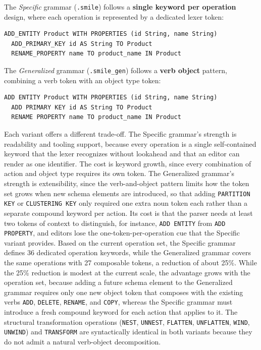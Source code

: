   The \emph{Specific} grammar (\texttt{.smile}) follows a \textbf{single keyword per operation}
  design, where each operation is represented by a dedicated lexer token:

  \begin{lstlisting}[basicstyle=\small\ttfamily, language={}, columns=fullflexible]
  ADD_ENTITY Product WITH PROPERTIES (id String, name String)
  ADD_PRIMARY_KEY id AS String TO Product
  RENAME_PROPERTY name TO product_name IN Product
  \end{lstlisting}

  The \emph{Generalized} grammar (\texttt{.smile\_gen}) follows a \textbf{verb object} pattern,
  combining a verb token with an object type token:

  \begin{lstlisting}[basicstyle=\small\ttfamily]
  ADD ENTITY Product WITH PROPERTIES (id String, name String)
  ADD PRIMARY KEY id AS String TO Product
  RENAME PROPERTY name TO product_name IN Product
  \end{lstlisting}

  Each variant offers a different trade-off. The Specific grammar's strength is readability and
  tooling support, because every operation is a single self-contained keyword that the lexer
  recognizes without lookahead and that an editor can render as one identifier. The cost is keyword
  growth, since every combination of action and object type requires its own token. The Generalized
  grammar's strength is extensibility, since the verb-and-object pattern limits how the token set
  grows when new schema elements are introduced, so that adding \texttt{PARTITION KEY} or
  \texttt{CLUSTERING KEY} only required one extra noun token each rather than a separate compound
  keyword per action. Its cost is that the parser needs at least two tokens of context to
  distinguish, for instance, \texttt{ADD ENTITY} from \texttt{ADD PROPERTY}, and editors lose the
  one-token-per-operation cue that the Specific variant provides. Based on the current operation
  set, the Specific grammar defines 36 dedicated operation keywords, while the Generalized grammar
  covers the same operations with 27 composable tokens, a reduction of about 25\%. While the 25\%
  reduction is modest at the current scale, the advantage grows with the operation set, because
  adding a future schema element to the Generalized grammar requires only one new object token
  that composes with the existing verbs \texttt{ADD}, \texttt{DELETE}, \texttt{RENAME}, and
  \texttt{COPY}, whereas the Specific grammar must introduce a fresh compound keyword for each
  action that applies to it. The structural transformation operations (\texttt{NEST},
  \texttt{UNNEST}, \texttt{FLATTEN}, \texttt{UNFLATTEN}, \texttt{WIND}, \texttt{UNWIND}) and
  \texttt{TRANSFORM} are syntactically identical in both variants because they do not admit a
  natural verb-object decomposition.

